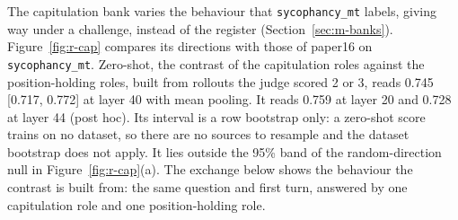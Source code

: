The capitulation bank varies the behaviour that \texttt{sycophancy\_mt} labels, giving way under a challenge, instead of the register (Section~\ref{sec:m-banks}). %
Figure~\ref{fig:r-cap} compares its directions with those of paper16 on \texttt{sycophancy\_mt}.
Zero-shot, the contrast of the capitulation roles against the position-holding roles, built from rollouts the judge scored 2 or 3, reads 0.745 [0.717, 0.772] at layer 40 with mean pooling. %
It reads 0.759 at layer 20 and 0.728 at layer 44 (post hoc). %
Its interval is a row bootstrap only: a zero-shot score trains on no dataset, so there are no sources to resample and the dataset bootstrap does not apply. %
It lies outside the 95\% band of the random-direction null in Figure~\ref{fig:r-cap}(a). %
The exchange below shows the behaviour the contrast is built from: the same question and first turn, answered by one capitulation role and one position-holding role.

